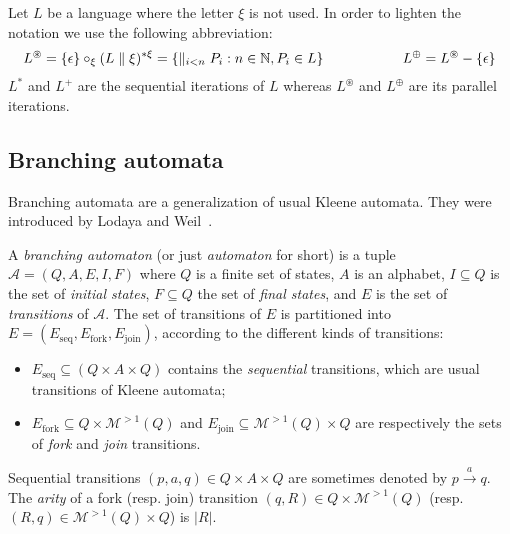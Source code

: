 \documentclass{CSML}
\begin{document}
Let $L$ be a language where the letter $\xi$ is not used.
In order to lighten the notation we use the following abbreviation:
$$L^\circledast=\{\epsilon\}\circ_\xi(L\parallel\xi)^{*\xi}= \{\parallel_{i<n}P_i : n\in {\mathbb{N}}, P_i\in L\}\hskip2cm L^\oplus=L^\circledast-\{\epsilon\}$$
$L^*$ and $L^+$ are the sequential iterations of $L$ whereas $L^\circledast$ and $L^\oplus$ are its parallel iterations.

\subsection{Branching automata}
\label{subsec:automata}

Branching automata are a generalization of usual Kleene automata.
They were introduced by Lodaya and Weil~\cite{lodaya98kleene,LW98:Algebra,LW00:sp}.

A \emph{branching automaton} (or just \emph{automaton} for short) is a tuple $\mathcal{A}=(Q, A, E, I, F)$ where $Q$ is a finite set of
states, $A$ is an alphabet, $I\subseteq Q$ is the set of \emph{initial states},
$F\subseteq Q$ the set of \emph{final states}, and $E$ is the set of \emph{transitions} of ${\mathcal A}$.
The set of transitions of $E$ is partitioned into $E=(E_\text{seq}, E_\text{fork}, E_\text{join})$, according to the different kinds of transitions:
\begin{itemize}
\item $E_\text{seq}\subseteq (Q\times A\times Q)$ contains the \emph{sequential} transitions, which are usual transitions of Kleene automata;
\item $E_\text{fork}\subseteq Q\times {\mathcal M}^{>1}(Q)$ and $E_\text{join}\subseteq{\mathcal M}^{>1}(Q)\times Q$ are respectively the sets of \emph{fork} and \emph{join} transitions.
\end{itemize}
Sequential transitions $(p,a,q) \in Q\times A\times Q$  are sometimes denoted by $p \mathop{\to}\limits^{a}q$.
The \emph{arity} of a fork (resp. join) transition $(q,R)\in Q\times {\mathcal M}^{>1}(Q)$ (resp. $(R,q)\in {\mathcal M}^{>1}(Q)\times Q$) is $\vert R\vert$. 
\end{document}
